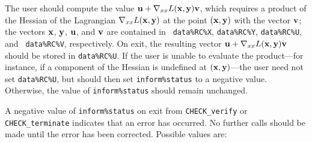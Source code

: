 \documentclass{galahad}
\newcommand{\packagename}{CHECK}
\begin{document}
\begin{description}
 The user should compute the value 
     ${\mathbf{u}} + \nabla_{xx} L({\mathbf{x}},{\mathbf{y}}){\mathbf{v}}$, which requires a product of the Hessian 
     of the Lagrangian $\nabla_{xx} L({\mathbf{x}},{\mathbf{y}})$ at the
     point $({\mathbf{x}},{\mathbf{y}})$ with the vector ${\mathbf{v}}$; the vectors
     ${\mathbf{x}}$, ${\mathbf{y}}$, ${\mathbf{u}}$, and ${\mathbf{v}}$ are contained in {\tt
       data\%RC\%X}, {\tt data\%RC\%Y}, {\tt data\%RC\%U}, and {\tt
       data\%RC\%V}, respectively.  On exit, the resulting
     vector ${\mathbf{u}} + \nabla_{xx} L({\mathbf{x}},{\mathbf{y}}){\mathbf{v}}$ should be stored in
     {\tt data\%RC\%U}.  If the user is
     unable to evaluate the product---for instance, 
     if a component of the Hessian is
     undefined at $({\mathbf{x}},{\mathbf{y}})$---the user need not set {\tt data\%RC\%U}, but
     should then set {\tt inform\%status} to a negative value.
     Otherwise, the value of {\tt inform\%status} should remain
     unchanged.

\end{description}


\galerrors
A negative value of {\tt inform\%status} on exit from 
{\tt \packagename\_verify}
or 
{\tt \packagename\_terminate}
indicates that an error has occurred. No further calls should be made
until the error has been corrected. Possible values are:
\end{document}
